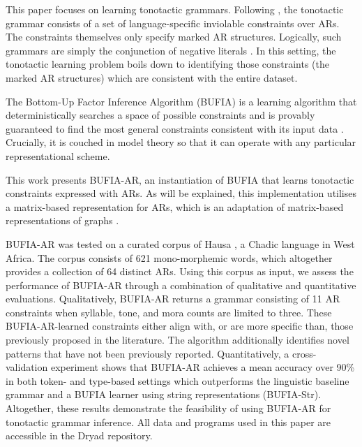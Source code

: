 \documentclass{CUP-JNL-PHO}%
\theoremstyle{definition}
\numberwithin{equation}{section}
\theoremstyle{definition}
\begin{document}
This paper focuses on learning tonotactic grammars. Following
\citet{jardine2017LocalNature}, the tonotactic grammar consists of a
set of language-specific inviolable constraints over ARs. The
constraints themselves only specify marked AR structures. Logically,
such grammars are simply the conjunction of negative literals
\citep{rogers.lambert2019mol}. In this setting, the tonotactic
learning problem boils down to identifying those constraints (the
marked AR structures) which are consistent with the entire dataset.

The Bottom-Up Factor Inference Algorithm (BUFIA) is a learning
algorithm that deterministically searches a space of possible
constraints and is provably guaranteed to find the most general
constraints consistent with its input data \citep{chandleeBufia2019,
	rawski2021structure}. Crucially, it is couched in model theory
\citep{Rogers1998, enderton2001mathematical} so that it can operate
with any particular representational scheme.

This work presents BUFIA-AR, an instantiation of BUFIA that learns
tonotactic constraints expressed with ARs. As will be explained, this
implementation utilises a matrix-based representation for ARs, which
is an adaptation of matrix-based representations of graphs
\citep{west2001introduction,CLRS2022}.

BUFIA-AR was tested on a curated corpus of Hausa \citep{wold-4,li2025learning}, a
Chadic language in West Africa. The corpus consists of 621
mono-morphemic words, which altogether provides a collection of 64
distinct ARs.  Using this corpus as input, we assess the performance
of BUFIA-AR through a combination of qualitative and quantitative
evaluations. Qualitatively, BUFIA-AR returns a grammar
consisting of 11 AR constraints when syllable, tone, and mora counts
are limited to three. These BUFIA-AR-learned constraints either align
with, or are more specific than, those previously proposed in the
literature. The algorithm additionally identifies novel patterns that
have not been previously reported. Quantitatively, a cross-validation
experiment shows that BUFIA-AR achieves a mean accuracy over 90\% in
both token- and type-based settings which outperforms the linguistic 
baseline grammar and a BUFIA learner using
string representations (BUFIA-Str). Altogether, these results
demonstrate the feasibility of using BUFIA-AR for tonotactic grammar
inference. All data and programs used in this paper are accessible in
the Dryad repository.
\end{document}
